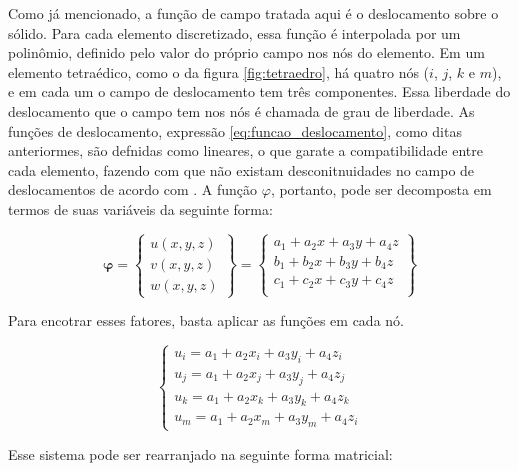 Como já mencionado, a função de campo tratada aqui é o deslocamento sobre o sólido. Para cada elemento discretizado, essa função é interpolada por um polinômio, definido pelo valor do próprio campo nos nós do elemento. Em um elemento tetraédico, como o da figura \ref{fig:tetraedro}, há quatro nós ($i$, $j$, $k$ e $m$), e em cada um o campo de deslocamento tem três componentes. Essa liberdade do deslocamento que o campo tem nos nós é chamada de grau de liberdade. As funções de deslocamento, expressão \ref{eq:funcao_deslocamento}, como ditas anteriormes, são defnidas como lineares, o que garate a compatibilidade entre cada elemento, fazendo com que não existam desconitnuidades no campo de deslocamentos de acordo com . A função $\varphi$, portanto, pode ser decomposta em termos de suas variáveis da seguinte forma:

\begin{equation} \label{eq:linear}
    \mathbf{\varphi} = 
    \begin{Bmatrix}
        u(x,y,z) \\ v(x,y,z) \\ w(x,y,z)
    \end{Bmatrix} 
    = \begin{Bmatrix}
        a_1 + a_2 x + a_3 y + a_4 z\\
        b_1 + b_2 x + b_3 y + b_4 z\\
        c_1 + c_2 x + c_3 y + c_4 z\\
    \end{Bmatrix}
\end{equation}

Para encotrar esses fatores, basta aplicar as funções em cada nó.

\begin{equation}
    \begin{cases}
        u_i = a_1 + a_2 x_i + a_3 y_i + a_4 z_i \\
        u_j = a_1 + a_2 x_j + a_3 y_j + a_4 z_j \\
        u_k = a_1 + a_2 x_k + a_3 y_k + a_4 z_k \\
        u_m = a_1 + a_2 x_m + a_3 y_m + a_4 z_i
    \end{cases}
\end{equation}

Esse sistema pode ser rearranjado na seguinte forma matricial:

